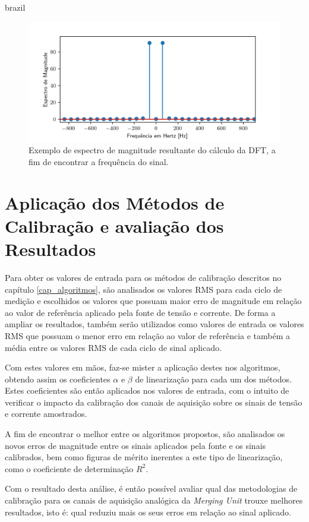 \begin{otherlanguage*}{brazil}
\begin{figure}[H]
    \centering
    \includegraphics[width=14cm]{pictures/spec_mag.png}
    \caption{Exemplo de espectro de magnitude resultante do cálculo da DFT, a fim de encontrar a frequência do sinal.}
    \label{fig:dft_freq}
\end{figure}

\section{Aplicação dos Métodos de Calibração e avaliação dos Resultados}

Para obter os valores de entrada para os métodos de calibração  descritos no capítulo \ref{cap_algoritmos}, são analisados os valores RMS para cada ciclo de medição e escolhidos os valores que possuam maior erro de magnitude em relação ao valor de referência aplicado pela fonte de tensão e corrente. De forma a ampliar os resultados, também serão utilizados como valores de entrada os valores RMS que possuam o menor erro em relação ao valor de referência e também a média entre os valores RMS de cada ciclo de sinal aplicado.

Com estes valores em mãos, faz-se mister a aplicação destes nos algoritmos, obtendo assim os coeficientes $\alpha$ e $\beta$ de linearização para cada um dos métodos. Estes coeficientes são então aplicados nos valores de entrada, com o intuito de verificar o impacto da calibração dos canais de aquisição sobre os sinais de tensão e corrente amostrados.

A fim de encontrar o melhor entre os algoritmos propostos, são analisados os novos erros de magnitude entre os sinais aplicados pela fonte e os sinais calibrados, bem como figuras de mérito inerentes a este tipo de linearização, como o coeficiente de determinação $R^2$. 

Com o resultado desta análise, é então possível avaliar qual das metodologias de calibração para os canais de aquisição analógica da \textit{Merging Unit} trouxe melhores resultados, isto é: qual reduziu mais os seus erros em relação ao sinal aplicado.


\end{otherlanguage*}
